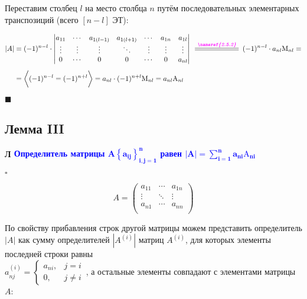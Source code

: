 \documentclass[12pt, a4paper]{report}
\newcommand{\sqbox}{%
	\collectbox{%
		\setlength{\fboxsep}{2pt}%
		\fbox{\BOXCONTENT}%
	}%
}
\newcommand{\lm}[1][]{\begin{flushleft}\textbf{\sqbox{Л} \textcolor{Blue}{#1}}\end{flushleft}}
\newcommand{\oversymbol}[2]{\overset{\textcolor{MMagenta}{\textbf{\textit{#1}}}}{\resizebox{\widthof{#1}}{\heightof{\(#2\)}}{\(#2\)}}}
\begin{document}
	\smallskip
	Переставим столбец \(l\) на место столбца \(n\) путём последовательных элементарных транспозиций (всего \([n-l]\) ЭТ):
	
	\begin{align*}
		|A|&=(-1)^{n-l}\cdot\begin{vmatrix}
								a_{11}&\cdots&a_{1(l-1)}&a_{1(l+1)}&\cdots&a_{1n}&a_{1l}\\
								\vdots&\vdots&\vdots&\ddots&\vdots&\vdots&\vdots\\
								0&\cdots&0&0&\cdots&0&a_{nl}\\
							\end{vmatrix}
		\oversymbol{\nameref{2.5.2}}{=}(-1)^{n-l}\cdot a_{nl}\mathrm{M}_{nl}=\\[5pt]
		&=\bigg\langle(-1)^{n-l}=(-1)^{n+l}\bigg\rangle=a_{nl}\cdot (-1)^{n+l}\mathrm{M}_{nl}=a_{nl}\mathrm{A}_{nl}
	\end{align*}
	
	\(\blacksquare\)
	\subsection{Лемма III}\label{2.5.4}
	
	\lm[Определитель матрицы \(\boldsymbol{A\left\{a_{ij}\right\}_{i,j=1}^{n}}\) равен \(\displaystyle\boldsymbol{ |A|=\sum_{i=1}^{n}a_{ni}\mathrm{A}_{ni}}\)]
	
	\(\square\)
	
	\[
		A=\begin{pmatrix}a_{11}&\cdots&a_{1n}\\
						\vdots&\ddots&\vdots\\
						a_{n1}&\cdots&a_{nn}\\
		\end{pmatrix}
	\]
	
	\smallskip
	По свойству прибавления строк другой матрицы можем представить определитель \(|A|\) как сумму определителей \(\left|A^{(i)}\right|\) матриц \(A^{(i)}\), для которых элементы последней строки равны\\ \(a_{nj}^{(i)}=\begin{cases}a_{ni},&j=i\\0,&j\neq i\end{cases}\)\,, а остальные элементы совпадают с элементами матрицы \(A\):
	
\end{document}
